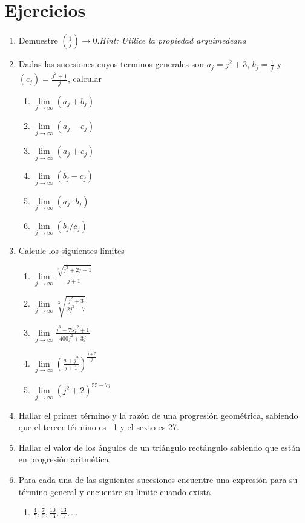\documentclass[12pt]{book}
\begin{document}
\section{Ejercicios}\label{EjerciciosSucesiones}
\begin{enumerate}
    \item Demuestre $(\frac{1}{j})\rightarrow 0$.\textit{Hint: Utilice la propiedad arquimedeana}
        \item Dadas las sucesiones cuyos terminos generales son $a_j=j^2+3$, $b_j=\frac{1}{j}$ y $(c_j)=\frac{j^2+1}{j}$, calcular
    \begin{enumerate}
        \item $\lim\limits_{j\to\infty} (a_j+b_j)$
        \item $\lim\limits_{j\to\infty} (a_j-c_j)$
        \item $\lim\limits_{j\to\infty} (a_j+c_j)$
        \item $\lim\limits_{j\to\infty} (b_j-c_j)$
        \item $\lim\limits_{j\to\infty} (a_j \cdot b_j)$
        \item $\lim\limits_{j\to\infty} (b_j/c_j)$
    \end{enumerate}
    \item Calcule los siguientes límites
    \begin{enumerate}
        \item $\lim\limits_{j\to\infty} \frac{\sqrt[3]{j^3+2j-1}}{j+1}$
        \item $\lim\limits_{j\to\infty} \sqrt[3]{\frac{j^2+3}{2j^2-7}}$
        \item $\lim\limits_{j\to\infty} \frac{j^3-75j^2+1}{400j^2+3j}$
        \item $\lim\limits_{j\to\infty} \left( \frac{a+j^2}{j+1}\right)^{\frac{j+5}{j}}$
        \item $\lim\limits_{j\to\infty} \left( j^2+2\right)^{55-7j}$
    \end{enumerate}
    \item Hallar el primer término y la razón de una progresión geométrica, sabiendo que el tercer término es –1 y el sexto es 27.
    \item Hallar el valor de los ángulos de un triángulo rectángulo sabiendo que están en progresión aritmética.
    \item Para cada una de las siguientes sucesiones encuentre una expresión para su término general y encuentre su límite cuando exista 
    \begin{enumerate}
        \item $\frac{4}{5},\frac{7}{9},\frac{10}{13},\frac{13}{17},\dots$

\end{enumerate}
\end{enumerate}
\end{document}
